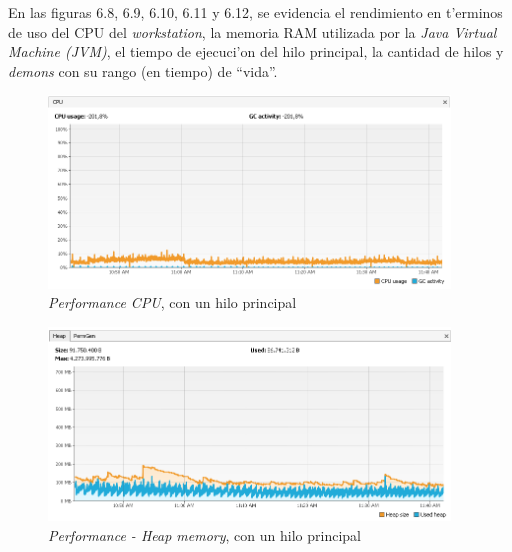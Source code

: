 \begin{table}[H]
\begin{center}
\end{center}
\caption{Resultados en modo secuencial}
\end{table}

En las figuras 6.8, 6.9, 6.10, 6.11 y 6.12, se evidencia el rendimiento en t'erminos de uso del CPU del \emph{workstation}, la memoria RAM utilizada por la \emph{Java Virtual Machine (JVM)},  el tiempo de ejecuci'on del hilo principal, la cantidad de hilos y \emph{demons} con su rango (en tiempo) de ``vida''.

\begin{figure}[H]
\centering
\includegraphics[width=0.95\textwidth]{images/Performance_CPU_1_Threads}
\caption{\emph{Performance CPU}, con un hilo principal}
\label{fig:6.8}
\end{figure}

\begin{figure}[H]
\centering
\includegraphics[width=0.95\textwidth]{images/Performance_HEAP_1_Threads}
\caption{\emph{Performance - Heap memory}, con un hilo principal}
\label{fig:6.9}
\end{figure}

